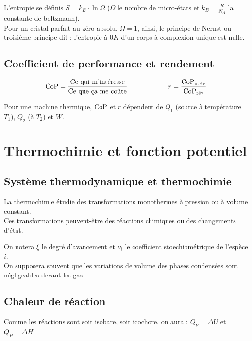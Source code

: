 \documentclass[13pt, twoside, a4paper, french]{report}
\begin{document}
        L'entropie se définis $S = k_B \cdot \ln \Omega$ ($\Omega$ le nombre de micro-états et $k_B = \frac{R}{N_A}$ la constante de boltzmann).\\

        Pour un cristal parfait au zéro absolu, $\Omega = 1$, ainsi, le principe de Nernst ou troisième principe dit : l'entropie à $0K$ d'un corps à complexion unique est nulle.


    \section{Coefficient de performance et rendement}

        \[\textrm{CoP} = \dfrac{\textrm{Ce qui m'intéresse}}{\textrm{Ce que ça me coûte}} \hspace{60pt} r = \dfrac{\textrm{CoP}_\textrm{irrév}}{\textrm{CoP}_\textrm{rév}}\]

        Pour une machine thermique, $\textrm{CoP}$ et $r$ dépendent de $Q_1$ (source à température $T_1$), $Q_2$ (à $T_2$) et $W$.


\chapter{Thermochimie et fonction potentiel}


    \section{Système thermodynamique et thermochimie}

        La thermochimie étudie des transformations monothermes à pression
        ou à volume constant.\\
        Ces transformations peuvent-être des réactions chimiques ou des changements d'état.
        \medskip

        On notera $\xi$ le degré d'avancement et $\nu_i$ le coefficient stoechiométrique de l'espèce $i$.\\
        On supposera souvent que les variations de volume des phases condensées sont négligeables devant les gaz.


    \section{Chaleur de réaction}

        Comme les réactions sont soit isobare, soit icochore, on aura :
        $Q_V = \Delta U$ et $Q_P = \Delta H$.
        \smallskip
\end{document}
